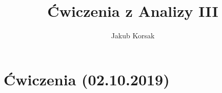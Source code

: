 \documentclass{article}
\title{Ćwiczenia z Analizy III}
\author{Jakub Korsak}
\begin{document}
\maketitle

\pagebreak
\section{Ćwiczenia (02.10.2019)}

\end{document}

